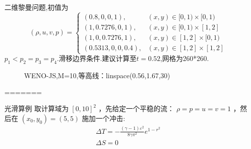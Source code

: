 \documentclass{book}
\begin{document}
\begin{example}
\begin{example}{}{}
\begin{example}
\begin{example}
\begin{example}
\begin{example}
\begin{example}{}{}
\begin{example}
二维黎曼问题\cite{RN13},初值为
\begin{equation}
    (\rho, u, v, p)=\begin{cases}
        (0.8,0,0,1),      & (x, y) \in[0,1) \times[0,1) \\
        (1,0.7276,0,1),   & (x, y) \in[0,1) \times[1,2] \\
        (1,0,0.7276,1),   & (x, y) \in[1,2] \times[0,1) \\
        (0.5313,0,0,0.4), & (x, y) \in[1,2] \times[1,2]
    \end{cases}
\end{equation}
$p_1<p_2=p_3=p_4$.滑移边界条件.建议计算至$t=0.52$,网格为260*260.

\begin{figure}[ht]%
    \centering
    \quad
    \caption{WENO-JS,M=10,等高线：linspace(0.56,1.67,30)}
\end{figure}
=======
\begin{example}{光滑算例}{}
    取计算域为  $[0,10]^{2}$  ，先给定一个平稳的流： $\rho=p=u=v=1$  ，然后在  $\left(x_{0}, y_{0}\right)=(5,5)$  施加一个冲击:
    \begin{equation}
        \begin{array}{l}
            \Delta T=-\frac{(\gamma-1) \varepsilon^{2}}{8 \gamma \pi^{2}} e^{1-r^{2}} \\
            \Delta S=0
        \end{array}

\end{equation}
\end{example}
\end{example}
\end{example}
\end{example}
\end{example}
\end{example}
\end{example}
\end{example}
\end{example}
\end{document}
